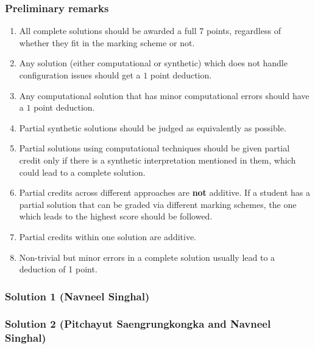 \subsubsection{Preliminary remarks}
\begin{enumerate}
    \item All complete solutions should be awarded a full 7 points, regardless of whether they fit in the marking scheme or not.
    \item Any solution (either computational or synthetic) which does not handle configuration issues should get a $1$ point deduction.
    \item Any computational solution that has minor computational errors should have a $1$ point deduction.
    \item Partial synthetic solutions should be judged as equivalently as possible.
    \item Partial solutions using computational techniques should be given partial credit only if there is a synthetic interpretation mentioned in them, which could lead to a complete solution.
    \item Partial credits across different approaches are \textbf{not} additive. If a student has a partial solution that can be graded via different marking schemes, the one which leads to the highest score should be followed.
    \item Partial credits within one solution are additive.
    \item Non-trivial but minor errors in a complete solution usually lead to a deduction of 1 point.
\end{enumerate}
\subsubsection{Solution 1 (Navneel Singhal)}
\begin{enumerate}
\end{enumerate}
\subsubsection{Solution 2 (Pitchayut Saengrungkongka and Navneel Singhal)}
\begin{enumerate}
\end{enumerate}
